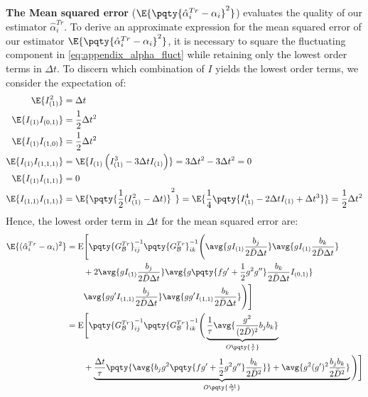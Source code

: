 \textbf{The Mean squared error} ($\E{\pqty{\hat{\alpha}_i^{Tr} - \alpha_i}^2}$) evaluates the quality of our estimator $\hat{\alpha}_i^{Tr}$. To derive an approximate expression for the mean squared error of our estimator $\E{\pqty{\hat{\alpha}_i^{Tr} - \alpha_i}^2}$, it is necessary to square the fluctuating component in \ref{eq:appendix_alpha_fluct} while retaining only the lowest order terms in $\Delta t$. To discern which combination of $I$ yields the lowest order terms, we consider the expectation of:
\begin{align}
    \E{I_{(1)}^2} &= \Delta t\\
    \E{I_{(1)} I_{(0,1)}} &= \frac{1}{2} \Delta t^2\\
    \E{I_{(1)} I_{(1,0)}}  &= \frac{1}{2} \Delta t^2\\
    \E{I_{(1)} I_{(1,1,1)}}  &= \E{I_{(1)} \left(I_{(1)}^3 - 3 \Delta t I_{(1)}  \right)} = 3 \Delta t^2 - 3 \Delta t^2 = 0\\
    \E{I_{(1)}I_{(1,1)}} &= 0\\
    \E{I_{(1,1)}I_{(1,1)}} &= \E{\pqty{\frac{1}{2}(I_{(1)}^2-\Delta t)}^2} = \E{\frac{1}{4}\pqty{I_{(1)}^4 - 2 \Delta t I_{(1)} + \Delta t^3}} = \frac{1}{2} \Delta t^2\\
\end{align}
Hence, the lowest order term in $\Delta t$ for the mean squared error are:
\begin{align}
    \E{(\hat{\alpha}_i^{Tr} - \alpha_i)^2} &= \mathrm{E}\Bigg[\pqty{G_{\mathcal{B}}^{Tr}}^{-1}_{ij}  \pqty{G_{\mathcal{B}}^{Tr}}^{-1}_{ik}\Bigg(\avg{g I_{(1)} \frac{b_j}{2 \bar{D} \Delta t}} \avg{g I_{(1)} \frac{b_k}{2 \bar{D} \Delta t}} \\
    &\qquad + 2\avg{g I_{(1)} \frac{b_j}{2 \bar{D} \Delta t}} \avg{g \pqty{fg'+ \frac{1}{2} g^2 g''} \frac{b_k}{2 \bar{D} \Delta t} I_{(0,1)}}\\
    &\qquad \avg{g g' I_{(1,1)} \frac{b_j}{2 \bar{D} \Delta t}} \avg{g g' I_{(1,1)} \frac{b_k}{2 \bar{D} \Delta t}}\Bigg)\Bigg]\\
    &= \mathrm{E}\Bigg[\pqty{G_{\mathcal{B}}^{Tr}}^{-1}_{ij}  \pqty{G_{\mathcal{B}}^{Tr}}^{-1}_{ik} \Bigg( \underbrace{\frac{1}{\tau}\avg{\frac{g^2}{(2\bar{D})^2} b_j b_k}}_{O\pqty{\frac{1}{\tau}}} \\
    &\qquad + \underbrace{\frac{\Delta t}{\tau} \pqty{\avg{b_j g^2 \pqty{fg'+ \frac{1}{2} g^2 g''} \frac{b_k}{2 \bar{D}^2} }} + \avg{g^2 (g')^2 \frac{b_j b_k}{2 \bar{D}^2}}}_{O\pqty{\frac{\Delta t}{\tau}}} \Bigg)   \Bigg]
    \label{eq:MSE_trapeze}
\end{align}
